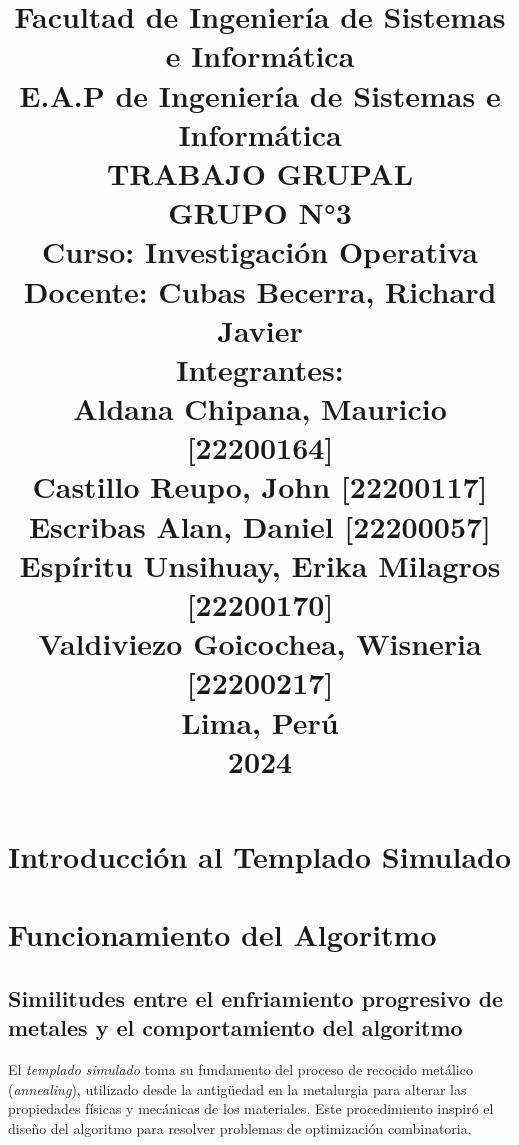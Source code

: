 \documentclass{article}
\begin{document}
\title{
Facultad de Ingeniería de Sistemas e Informática\\
E.A.P de Ingeniería de Sistemas e Informática\\
\vspace{1cm}
TRABAJO GRUPAL\\
\vspace{1cm}
GRUPO N°3\\
\vspace{1cm}
Curso: Investigación Operativa\\
Docente: Cubas Becerra, Richard Javier\\
\vspace{1cm}
Integrantes:\\
Aldana Chipana, Mauricio \hfill [22200164]\\
Castillo Reupo, John \hfill [22200117]\\
Escribas Alan, Daniel \hfill [22200057]\\
Espíritu Unsihuay, Erika Milagros \hfill [22200170]\\
Valdiviezo Goicochea, Wisneria \hfill [22200217]\\
\vspace{1cm}
Lima, Perú\\
2024
}
\date{}

\maketitle
\newpage %

\tableofcontents %
\newpage %

\section{Introducción al Templado Simulado}

\section{Funcionamiento del Algoritmo}

\subsection{Similitudes entre el enfriamiento progresivo de metales y el comportamiento del algoritmo}

El \textit{templado simulado} toma su fundamento del proceso de recocido metálico (\textit{annealing}), utilizado desde la antigüedad en la metalurgia para alterar las propiedades físicas y mecánicas de los materiales. Este procedimiento inspiró el diseño del algoritmo para resolver problemas de optimización combinatoria.
\end{document}
